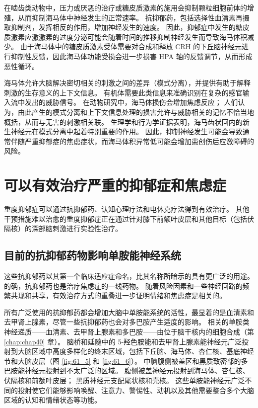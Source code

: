 在啮齿类动物中，压力或厌恶的治疗或糖皮质激素的施用会抑制颗粒细胞前体的增殖，从而抑制海马体中神经发生的正常速率。
抗抑郁药，包括选择性血清素再摄取抑制剂，发挥相反的作用，增加神经发生的速度。
因此，抑郁症中发生的糖皮质激素应激激素的过度分泌可能会随着时间的推移抑制神经发生而导致海马体积减少。
由于海马体中的糖皮质激素受体需要对合成和释放 CRH 的下丘脑神经元进行抑制性反馈，因此海马体功能受损会进一步损害 HPA 轴的反馈调节，从而形成恶性循环。


海马体允许大脑解决密切相关的刺激之间的差异（模式分离），并提供有助于解释刺激的生存意义的上下文信息。
有机体需要此类信息来准确识别在复杂的感官输入流中发出的威胁信号。
在动物研究中，海马体损伤会增加焦虑反应；
人们认为，由此产生的模式分离和上下文信息处理的损害允许与威胁相关的记忆不恰当地概括，从而与无害的刺激相关联。
生理学和行为学证据表明，海马齿状回内的新生神经元在模式分离中起着特别重要的作用。
因此，抑制神经发生可能会导致通常伴随严重抑郁症的焦虑症状，而海马体积异常低可能会增加患创伤后应激障碍的风险。



\section{可以有效治疗严重的抑郁症和焦虑症}

重度抑郁症可以通过抗抑郁药、认知心理疗法和电休克疗法得到有效治疗。
其他干预措施难以治愈的重度抑郁症正在通过针对膝下前额叶皮层和其他目标（包括伏隔核）的深部脑刺激进行实验性治疗。



\subsection{目前的抗抑郁药物影响单胺能神经系统}

这些抗抑郁药以其第一个临床适应症命名，比其名称所暗示的具有更广泛的用途。
的确，抗抑郁药也是治疗焦虑症的一线药物。
随着风险因素和一些神经回路的频繁共现和共享，有效治疗方式的重叠进一步证明情绪和焦虑症是相关的。


所有广泛使用的抗抑郁药都会增加大脑中单胺能系统的活性，最显着的是血清素和去甲肾上腺素，尽管一些抗抑郁药也会对多巴胺产生适度的影响。
相关的单胺类神经递质——血清素、去甲肾上腺素和多巴胺——由位于脑干核内的细胞合成（第 \ref{chap:chap40} 章）。
脑桥和延髓中的 5-羟色胺能和去甲肾上腺素能神经元广泛投射到大脑区域中高度多样化的终末区域，包括下丘脑、海马体、杏仁核、基底神经节和大脑皮层（图 \ref{fig:61_5} 和 \ref{fig:61_6}）。
中脑腹侧被盖区和黑质致密部的多巴胺能神经元投射到不太广泛的区域。
腹侧被盖神经元投射到海马体、杏仁核、伏隔核和前额叶皮层；
黑质神经元支配尾状核和壳核。
这些单胺能神经元广泛不同的投射使它们能够影响唤醒、注意力、警惕性、动机以及其他需要整合多个大脑区域的认知和情绪状态等功能。



